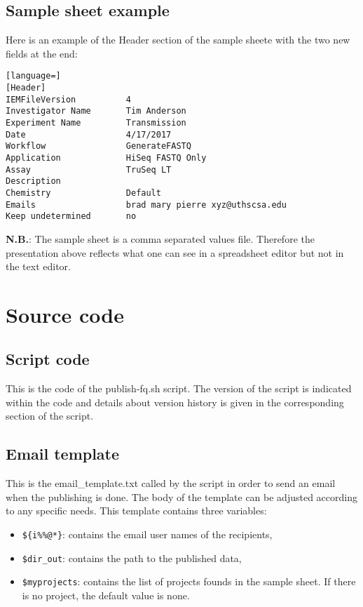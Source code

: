 \documentclass[11pt]{report}
\begin{document}
 \section{Sample sheet example}
\label{sec:ss-example}

Here is an example of the Header section of the sample sheete with the two new fields at the end:

\begin{lstlisting}[language=]
[Header]
IEMFileVersion      	4
Investigator Name   	Tim Anderson
Experiment Name     	Transmission
Date                	4/17/2017
Workflow	            GenerateFASTQ
Application 	        HiSeq FASTQ Only
Assay           	    TruSeq LT
Description
Chemistry  		        Default
Emails          	    brad mary pierre xyz@uthscsa.edu
Keep undetermined   	no
\end{lstlisting}

\noindent \textbf{N.B.}: The sample sheet is a comma separated values file. Therefore the presentation above reflects what one can see in a spreadsheet editor but not in the text editor.



 \chapter*{Source code}
\setcounter{section}{0}

 \section{Script code}

This is the code of the publish-fq.sh script. The version of the script is indicated within the code and details about version history is given in the corresponding section of the script.



 \section{Email template}

This is the email\_template.txt called by the script in order to send an email when the publishing is done. The body of the template can be adjusted according to any specific needs. This template contains three variables:
\begin{itemize}
	\item \verb|${i%%@*}|: contains the email user names of the recipients,
	\item \verb|$dir_out|: contains the path to the published data,
	\item \verb|$myprojects|: contains the list of projects founds in the sample sheet. If there is no project, the default value is none.
\end{itemize}


\end{document}
